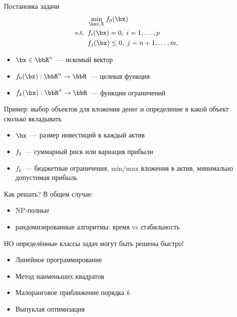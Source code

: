 \documentclass[12pt]{beamer}
\begin{document}
\begin{frame}{Постановка задачи}
\begin{equation*}
\begin{split}
&\min\limits_{\bx \in X} f_0(\bx)\\
\text{s.t. } & f_i(\bx) = 0, \; i = 1,\ldots,p\\
& f_j(\bx) \leq 0, \; j = n+1,\ldots,m,
\end{split}
\end{equation*}
\begin{itemize}
\item $\bx \in \bbR^n$~--- искомый вектор
\item $f_0(\bx): \bbR^n \rightarrow \bbR$~--- целевая функция
\item $f_k(\bx): \bbR^n \rightarrow \bbR$~--- функции ограничений
\end{itemize}
Пример: выбор объектов для вложения денег и определение в какой объект сколько вкладывать
\begin{itemize}
\item $\bx$~--- размер инвестиций в каждый актив
\item $f_0$~--- суммарный риск или вариация прибыли
\item $f_k$~--- бюджетные ограничения, min/max вложения в актив, минимально допустимая прибыль
\end{itemize}

\end{frame}

\begin{frame}{Как решать?}
В общем случае:
\begin{itemize}
\item NP-полные
\item {\small рандомизированные алгоритмы: время vs стабильность}
\end{itemize}

{\small НО определённые классы задач могут быть решены быстро!}

\begin{itemize}
\item Линейное программирование
\item Метод наименьших квадратов
\item Малоранговое приближение порядка $k$
\item Выпуклая оптимизация
\end{itemize}
\end{frame}
\end{document}
